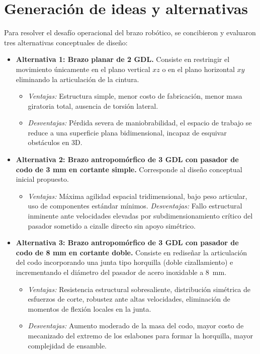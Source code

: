\documentclass[11pt,a4paper]{article}
\begin{document}
\section{Generación de ideas y alternativas}
Para resolver el desafío operacional del brazo robótico, se concibieron y evaluaron tres alternativas conceptuales de diseño:
\begin{itemize}
    \item \textbf{Alternativa 1: Brazo planar de 2 GDL.}
    Consiste en restringir el movimiento únicamente en el plano vertical $xz$ o en el plano horizontal $xy$ eliminando la articulación de la cintura.
    \begin{itemize}
        \item \textit{Ventajas:} Estructura simple, menor costo de fabricación, menor masa giratoria total, ausencia de torsión lateral.
        \item \textit{Desventajas:} Pérdida severa de maniobrabilidad, el espacio de trabajo se reduce a una superficie plana bidimensional, incapaz de esquivar obstáculos en 3D.
    \end{itemize}
    \item \textbf{Alternativa 2: Brazo antropomórfico de 3 GDL con pasador de codo de 3 mm en cortante simple.}
    Corresponde al diseño conceptual inicial propuesto.
    \begin{itemize}
        \item \textit{Ventajas:} Máxima agilidad espacial tridimensional, bajo peso articular, uso de componentes estándar mínimos.
        \textit{Desventajas:} Fallo estructural inminente ante velocidades elevadas por subdimensionamiento crítico del pasador sometido a cizalle directo sin apoyo simétrico.
    \end{itemize}
    \item \textbf{Alternativa 3: Brazo antropomórfico de 3 GDL con pasador de codo de 8 mm en cortante doble.}
    Consiste en rediseñar la articulación del codo incorporando una junta tipo horquilla (doble cizallamiento) e incrementando el diámetro del pasador de acero inoxidable a 8~mm.
    \begin{itemize}
        \item \textit{Ventajas:} Resistencia estructural sobresaliente, distribución simétrica de esfuerzos de corte, robustez ante altas velocidades, eliminación de momentos de flexión locales en la junta.
        \item \textit{Desventajas:} Aumento moderado de la masa del codo, mayor costo de mecanizado del extremo de los eslabones para formar la horquilla, mayor complejidad de ensamble.
    \end{itemize}
\end{itemize}
\end{document}
